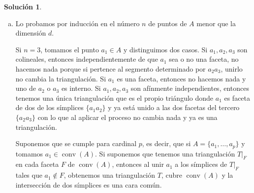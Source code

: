 \documentclass[10pt]{article}
\theoremstyle{definition}
\newtheorem*{sol}{Solución}
\newcommand{\conv}{\operatorname{conv}}
\begin{document}
\begin{sol}\leavevmode
\begin{enumerate}[(a)]
    \item Lo probamos por inducción en el número $n$ de puntos de  $A$ menor que la dimensión $d$.
    
    Si $n=3$, tomamos el punto $a_1\in A$ y distinguimos dos casos. Si $a_1,a_2,a_3$ son colineales, entonces independientemente de que $a_1$ sea o no una faceta, no hacemos nada porque si pertence al segmento determinado por $a_2a_3$, unirlo no cambia la triangulación. Si $a_1$ es una faceta, entonces no hacemos nada y uno de $a_2$ o $a_3$ es interno. Si $a_1,a_2,a_3$ son afínmente independientes, entonces tenemos una única triangulación que es el propio triángulo donde $a_1$ es faceta de dos de los símplices $\{a_1a_2\}$ y ya está unido a las dos facetas del tercero $\{a_2a_3\}$ con lo que al aplicar el proceso no cambia nada y ya es una triangulación.
    
    Suponemos que se cumple para cardinal $p$, es decir, que si $A=\{a_1,\ldots,a_p\}$ y tomamos $a_1\in\conv(A)$. Si suponemos que tenemos una triangulación $T|_F$ en cada faceta $F$ de $\conv(A)$, entonces al unir $a_1$ a los símplices de $T|_F$ tales que $a_1\notin F$, obtenemos una triangulación $T$, cubre $\conv(A)$ y la intersección de dos símplices es una cara común.
    

\end{enumerate}
\end{sol}
\end{document}
